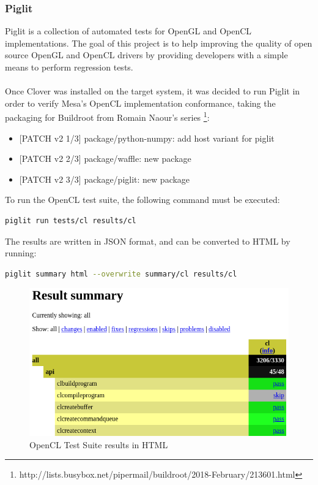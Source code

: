 \documentclass[12pt,a4paper,oneside]{article}
\begin{document}
\subsubsection*{Piglit}
Piglit is a collection of automated tests for OpenGL and OpenCL implementations.
The goal of this project is to help improving the quality of open source OpenGL and
OpenCL drivers by providing developers with a simple means to perform regression
tests.\\\\
Once Clover was installed on the target system, it was decided to run Piglit in
order to verify Mesa's OpenCL implementation conformance, taking the packaging
for Buildroot from Romain Naour's series
\footnote{http://lists.busybox.net/pipermail/buildroot/2018-February/213601.html}:
\begin{itemize}
  \item {[PATCH v2 1/3]} package/python-numpy: add host variant for piglit
  \item {[PATCH v2 2/3]} package/waffle: new package
  \item {[PATCH v2 3/3]} package/piglit: new package
\end{itemize}
To run the OpenCL test suite, the following command must be executed:
\begin{lstlisting}[language=sh]
  piglit run tests/cl results/cl
\end{lstlisting}
The results are written in JSON format, and can be converted to HTML by running:
\begin{lstlisting}[language=sh]
  piglit summary html --overwrite summary/cl results/cl
\end{lstlisting}
\begin{figure}[H]
\centering
  \includegraphics[scale=0.65]{img/html_output.png}
  \caption{OpenCL Test Suite results in HTML}
  \label{fig:html_output}
\end{figure}
\end{document}
